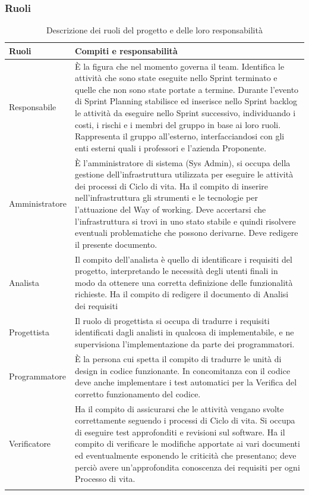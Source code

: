\documentclass[a4paper,12pt]{article}
\begin{document}
\subsubsection{Ruoli}
\begin{center}
\small
{} 
\begin{longtable}{| m{3cm} | m{} |}
\hline
\rowcolor{gray!60} 
{\centering \textbf{Ruoli}} &
{\centering \textbf{Compiti e responsabilità}} \\
\hline
\rowcolor{white}
\centering Responsabile & È la figura che nel momento governa il team. Identifica le attività che sono state eseguite nello Sprint terminato e quelle che non sono state portate a termine. Durante l'evento di Sprint Planning stabilisce ed inserisce nello Sprint backlog le attività da eseguire nello Sprint successivo, individuando i costi, i rischi e i membri del gruppo in base ai loro ruoli. Rappresenta il gruppo all'esterno, interfacciandosi con gli enti esterni quali i professori e l'azienda Proponente.    \\
\hline
\rowcolor{gray!20}
\centering Amministratore & È l'amministratore di sistema (Sys Admin), si occupa della gestione dell'infrastruttura utilizzata per eseguire le attività dei processi di Ciclo di vita. Ha il compito di inserire nell'infrastruttura gli strumenti e le tecnologie per l'attuazione del Way of working. Deve accertarsi che l'infrastruttura si trovi in uno stato stabile e quindi risolvere eventuali problematiche che possono derivarne. Deve redigere il presente documento.\\
\hline
\rowcolor{white}
\centering Analista & Il compito dell'analista è quello di identificare i requisiti del progetto, interpretando le necessità degli utenti finali in modo da ottenere una corretta definizione delle funzionalità richieste. Ha il compito di redigere il documento di Analisi dei requisiti \\
\hline
\rowcolor{gray!20}
\centering Progettista & Il ruolo di progettista si occupa di tradurre i requisiti identificati dagli analisti in qualcosa di implementabile, e ne supervisiona l'implementazione da parte dei programmatori. \\
\hline
\rowcolor{white}
\centering Programmatore & È la persona cui spetta il compito di tradurre le unità di design in codice funzionante. In concomitanza con il codice deve anche implementare i test automatici per la Verifica del corretto funzionamento del codice.\\
\hline
\rowcolor{gray!20}
\centering Verificatore & Ha il compito di assicurarsi che le attività vengano svolte correttamente seguendo i processi di Ciclo di vita. Si occupa di eseguire test approfonditi e revisioni sul software. Ha il compito di verificare le modifiche apportate ai vari documenti ed eventualmente esponendo le criticità che presentano; deve perciò avere un'approfondita conoscenza dei requisiti per ogni Processo di vita.\\
\hline
\caption{Descrizione dei ruoli del progetto e delle loro responsabilità} \\
\end{longtable}
\end{center}
\end{document}
